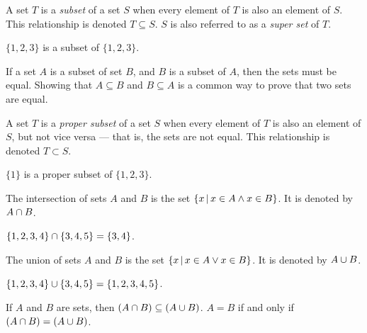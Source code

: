 \begin{defn}\label{subset}
    A set $T$ is a \emph{subset} of a set $S$ when every element of $T$ is also an element of $S$. This relationship is denoted $T \subseteq S$. $S$ is also referred to as a \emph{super set} of $T$.
\end{defn}

\begin{exmp}
    $\{1, 2, 3\}$ is a subset of $\{1, 2, 3\}$.
\end{exmp}

\begin{rmk}
    If a set $A$ is a subset of set $B$, and $B$ is a subset of $A$, then the sets must be equal. Showing that $A \subseteq B$ and $B \subseteq A$ is a common way to prove that two sets are equal.
\end{rmk}

\begin{defn}\label{proper-subset}
    A set $T$ is a \emph{proper subset} of a set $S$ when every element of $T$ is also an element of $S$, but not vice versa --- that is, the sets are not equal. This relationship is denoted $T \subset S$.
\end{defn}

\begin{exmp}
    $\{1\}$ is a proper subset of $\{1, 2, 3\}$.
\end{exmp}

\begin{defn}\label{intersection}
    The intersection of sets $A$ and $B$ is the set $\left\{x \,\middle|\, x \in A \land x \in B \right\}$. It is denoted by $A \cap B$.
\end{defn}

\begin{exmp}
    $\{1, 2, 3, 4\} \cap \{3, 4, 5\} = \{3, 4\}$.
\end{exmp}

\begin{defn}
    The union of sets $A$ and $B$ is the set $\left\{x \,\middle|\, x \in A \lor x \in B\right\}$. It is denoted by $A \cup B$.
\end{defn}

\begin{exmp}
    $\{1, 2, 3, 4\} \cup \{3, 4, 5\} = \{1, 2, 3, 4, 5\}$.
\end{exmp}

\begin{rmk}
    If $A$ and $B$ are sets, then $(A \cap B) \subseteq (A \cup B)$. $A = B$ if and only if $(A \cap B) = (A \cup B)$.
\end{rmk}

